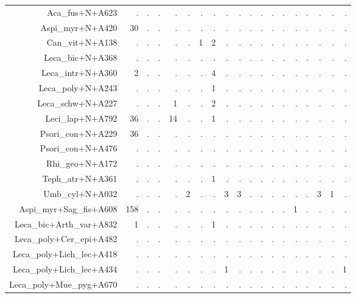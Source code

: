 \documentclass[a4paper, 11]{article}\usepackage[]{graphicx}\usepackage[]{color}
\begin{document}
\begin{table}
\begin{tabular}{rrrrrrrrrrrrrrrrrrr}
  \hline
Aca\_fus+N+A623 & . & . & . & . & . & . & . & . & . & . & . & . & . & . & . & . & . & . \\ 
  Aspi\_myr+N+A420 & 30 & . & . & . & . & . & . & . & . & . & . & . & . & . & . & . & . & . \\ 
  Can\_vit+N+A138 & . & . & . & . & . & 1 & 2 & . & . & . & . & . & . & . & . & . & . & . \\ 
  Leca\_bic+N+A368 & . & . & . & . & . & . & . & . & . & . & . & . & . & . & . & . & . & . \\ 
  Leca\_intr+N+A360 & 2 & . & . & . & . & . & 4 & . & . & . & . & . & . & . & . & . & . & . \\ 
  Leca\_poly+N+A243 & . & . & . & . & . & . & 1 & . & . & . & . & . & . & . & . & . & . & . \\ 
  Leca\_schw+N+A227 & . & . & . & 1 & . & . & 2 & . & . & . & . & . & . & . & . & . & . & . \\ 
  Leci\_lap+N+A792 & 36 & . & . & 14 & . & . & 1 & . & . & . & . & . & . & . & . & . & . & . \\ 
  Psori\_con+N+A229 & 36 & . & . & . & . & . & . & . & . & . & . & . & . & . & . & . & . & . \\ 
  Psori\_con+N+A476 & . & . & . & . & . & . & . & . & . & . & . & . & . & . & . & . & . & . \\ 
  Rhi\_geo+N+A172 & . & . & . & . & . & . & . & . & . & . & . & . & . & . & . & . & . & . \\ 
  Teph\_atr+N+A361 & . & . & . & . & . & . & 1 & . & . & . & . & . & . & . & . & . & . & . \\ 
  Umb\_cyl+N+A032 & . & . & . & . & 2 & . & . & 3 & 3 & . & . & . & . & . & . & 3 & 1 & . \\ 
  Aspi\_myr+Sag\_fis+A608 & 158 & . & . & . & . & . & . & . & . & . & . & . & . & 1 & . & . & . & . \\ 
  Leca\_bic+Arth\_var+A832 & 1 & . & . & . & . & . & 1 & . & . & . & . & . & . & . & . & . & . & . \\ 
  Leca\_poly+Cer\_epi+A482 & . & . & . & . & . & . & . & . & . & . & . & . & . & . & . & . & . & . \\ 
  Leca\_poly+Lich\_lec+A418 & . & . & . & . & . & . & . & . & . & . & . & . & . & . & . & . & . & . \\ 
  Leca\_poly+Lich\_lec+A434 & . & . & . & . & . & . & . & 1 & . & . & . & . & . & . & . & . & . & 1 \\ 
  Leca\_poly+Mue\_pyg+A670 & . & . & . & . & . & . & . & . & . & . & . & . & . & . & . & . & . & . \\ 

\end{tabular}
\end{table}
\end{document}
